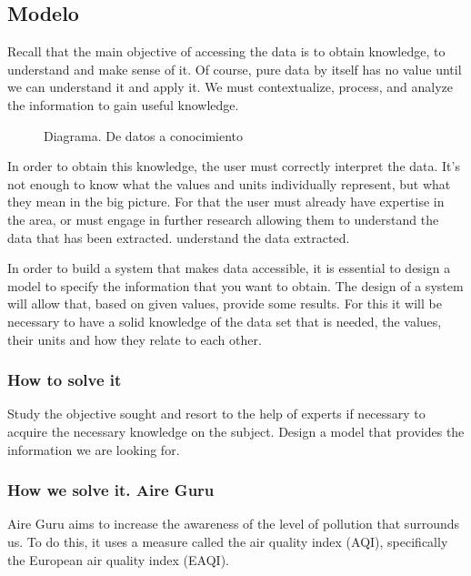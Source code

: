 \subsection{Modelo}

Recall that the main objective of accessing the data is to obtain knowledge, to understand and make sense of it. Of course, pure data by itself has no value until we can understand it and apply it. We must contextualize, process, and analyze the information to gain useful knowledge. \\
    
\begin{figure}[ht]
    \centering 
      \caption{Diagrama. De datos a conocimiento}
    \end{figure}
 
    In order to obtain this knowledge, the user must correctly interpret the data. It's not enough to know what the values and units individually represent, but what they mean in the big picture. For that the user must already have expertise in the area, or must engage in further research allowing them to understand the data that has been extracted.
    understand the data extracted.
    
    In order to build a system that makes data accessible, it is essential to design a model to specify the
    information that you want to obtain. The design of a system will allow that, based on given values, provide some results.
    For this it will be necessary to have a solid knowledge of the data set that is needed, the values,
    their units and how they relate to each other.


\subsubsection{How to solve it} 
Study the objective sought and resort to the help of experts if necessary to acquire the necessary knowledge
on the subject. Design a model that provides the information we are looking for.

\subsubsection{How we solve it. Aire Guru} 
Aire Guru aims to increase the awareness of the level of pollution that surrounds us. To do this, it uses a measure called
the air quality index (AQI), specifically the European air quality index (EAQI).


